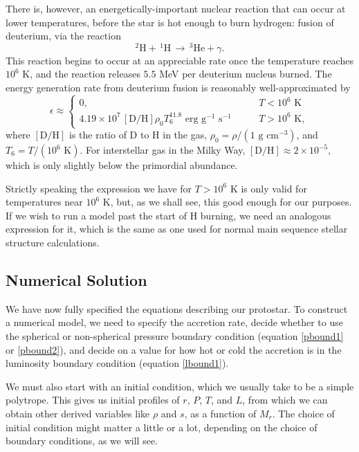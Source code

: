 There is, however, an energetically-important nuclear reaction that can occur at lower temperatures, before the star is hot enough to burn hydrogen: fusion of deuterium, via the reaction
\begin{equation}
^2\mbox{H} + \,^1\mbox{H}\, \rightarrow \, ^3\mbox{He} + \gamma.
\end{equation}
This reaction begins to occur at an appreciable rate once the temperature reaches $10^6$ K, and the reaction releases $5.5$ MeV per deuterium nucleus burned. The energy generation rate from deuterium fusion is reasonably well-approximated by \citep{kippenhahn94a}
\begin{equation}
\epsilon \approx 
\left\{
\begin{array}{ll}
0, & T < 10^6\mbox{ K} \\
4.19\times 10^7\, [\mbox{D}/\mbox{H}] \rho_0 T_6^{11.8} \mbox{ erg g}^{-1}\mbox{ s}^{-1}
\qquad & T > 10^6\mbox{ K},
\end{array}
\right.
\end{equation}
where $[\mbox{D}/\mbox{H}]$ is the ratio of D to H in the gas, $\rho_0=\rho/(1\mbox{ g cm}^{-3})$, and $T_6=T/(10^6\mbox{ K})$. For interstellar gas in the Milky Way, $[\mbox{D}/\mbox{H}]\approx 2\times 10^{-5}$, which is only slightly below the primordial abundance.

Strictly speaking the expression we have for $T>10^6$ K is only valid for temperatures near $10^6$ K, but, as we shall see, this good enough for our purposes. If we wish to run a model past the start of H burning, we need an analogous expression for it, which is the same as one used for normal main sequence stellar structure calculations.

\subsection{Numerical Solution}
\label{ssec:protostar_numeric}

We have now fully specified the equations describing our protostar. To construct a numerical model, we need to specify the accretion rate, decide whether to use the spherical or non-spherical pressure boundary condition (equation \ref{pbound1} or \ref{pbound2}), and decide on a value for how hot or cold the accretion is in the luminosity boundary condition (equation \ref{lbound1}).

We must also start with an initial condition, which we usually take to be a simple polytrope. This gives us initial profiles of $r$, $P$, $T$, and $L$, from which we can obtain other derived variables like $\rho$ and $s$, as a function of $M_r$. The choice of initial condition might matter a little or a lot, depending on the choice of boundary conditions, as we will see.

